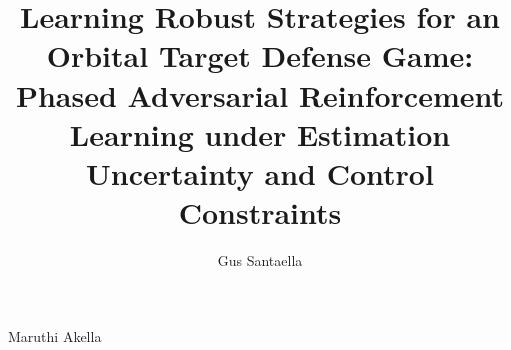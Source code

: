 \author{Gus Santaella}  	%

\address{gussantaella@utexas.edu}  %

\title{Learning Robust Strategies for an Orbital Target Defense Game: Phased Adversarial Reinforcement Learning under Estimation Uncertainty and Control Constraints} %


%
%
%
%
%
%
\supervisor
	{Maruthi Akella}

%
%
%
%
%
%


